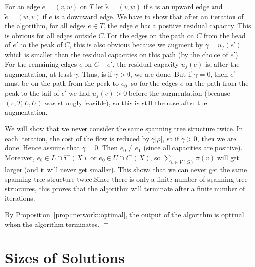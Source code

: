 \documentclass[12pt, showidx, twoside]{article}
\def\endproof{\hfill{$\Box$}}
\let\oldsection\section
\def\section{\cleardoublepage\oldsection}
\begin{document}
{{{For an edge $e = (v,w)$ on $T$ let $\tilde e = (v,w)$ 
if $e$ is an upward edge and $\tilde e = (w,v)$ if $e$ is a
downward edge. We have to show that after an iteration of the 
algorithm, for all edges $e \in T$, the edge $\tilde e$ has
a positive residual capacity. This is obvious for all edges 
outside $C$. %
For the edges on the path on $C$ from the head of $e'$ to the
peak of $C$, this is also obvious because we augment by
$\gamma = u_f(e')$ which is smaller than the residual capacities
on this path (by the choice of $e'$). For the remaining edges $e$
on $C - e'$, the residual capacity $u_f(\tilde e)$ is, after the augmentation, at least
$\gamma$. Thus, is if $\gamma > 0$, we are done.
But if $\gamma = 0$, then $e'$ must be on the path from the
peak to $e_0$, so for the edges $e$ on the path from the peak to
the tail of $e'$ we had $u_f(\tilde e) > 0$ before the augmentation
(because $(r,T,L,U)$ was strongly feasible), so this is still the
case after the augmentation.

We will show that we never consider the same spanning tree
structure twice. 
In each iteration, the cost of the flow is reduced by 
$\gamma|\rho|$, so if $\gamma > 0$, then we are done.
Hence assume that $\gamma = 0$.
Then $e_0 \neq e_1$ (since all capacities are positive).
Moreover, 
$e_0 \in L \cap \delta^-(X)$ or $e_0 \in U \cap \delta^+(X)$,
so $\sum_{v \in V(G)} \pi(v)$ will get larger (and it will never get
smaller).
This shows that we can never get 
the same spanning tree structure twice.Since there is only
a finite number of spanning tree structures, this proves that
the algorithm will terminate after a finite number of iterations.

By Proposition~\ref{prop::network::optimal}, the output of the
algorithm is optimal when the algorithm terminates.
\endproof


\iffalse
\section{Sizes of Solutions}

}}}
\end{document}
